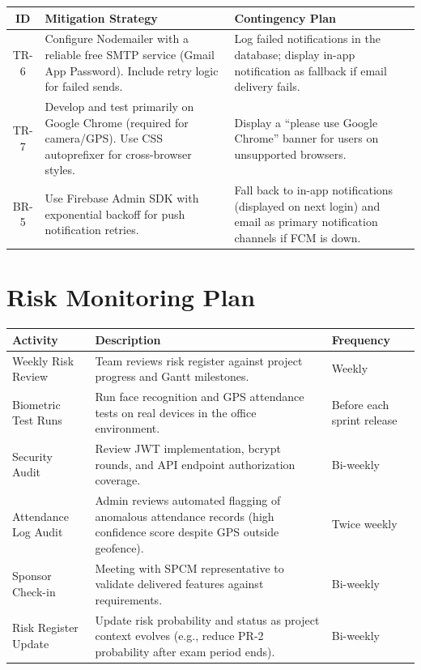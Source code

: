 \documentclass[12pt,a4paper]{article}
\begin{document}
\begin{center}
\small
\begin{tabularx}{\textwidth}{c X X}
\toprule
\textbf{ID} & \textbf{Mitigation Strategy} & \textbf{Contingency Plan} \\
\midrule
TR-6 & Configure Nodemailer with a reliable free SMTP service (Gmail App Password). Include retry logic for failed sends. & Log failed notifications in the database; display in-app notification as fallback if email delivery fails. \\[6pt]
TR-7 & Develop and test primarily on Google Chrome (required for camera/GPS). Use CSS autoprefixer for cross-browser styles. & Display a ``please use Google Chrome'' banner for users on unsupported browsers. \\[6pt]
BR-5 & Use Firebase Admin SDK with exponential backoff for push notification retries. & Fall back to in-app notifications (displayed on next login) and email as primary notification channels if FCM is down. \\[6pt]
\bottomrule
\end{tabularx}
\end{center}

\section{Risk Monitoring Plan}

\begin{center}
\begin{tabularx}{\textwidth}{l X l}
\toprule
\textbf{Activity} & \textbf{Description} & \textbf{Frequency} \\
\midrule
Weekly Risk Review & Team reviews risk register against project progress and Gantt milestones. & Weekly \\[4pt]
Biometric Test Runs & Run face recognition and GPS attendance tests on real devices in the office environment. & Before each sprint release \\[4pt]
Security Audit & Review JWT implementation, bcrypt rounds, and API endpoint authorization coverage. & Bi-weekly \\[4pt]
Attendance Log Audit & Admin reviews automated flagging of anomalous attendance records (high confidence score despite GPS outside geofence). & Twice weekly \\[4pt]
Sponsor Check-in & Meeting with SPCM representative to validate delivered features against requirements. & Bi-weekly \\[4pt]
Risk Register Update & Update risk probability and status as project context evolves (e.g., reduce PR-2 probability after exam period ends). & Bi-weekly \\[4pt]
\bottomrule
\end{tabularx}
\end{center}
\end{document}
